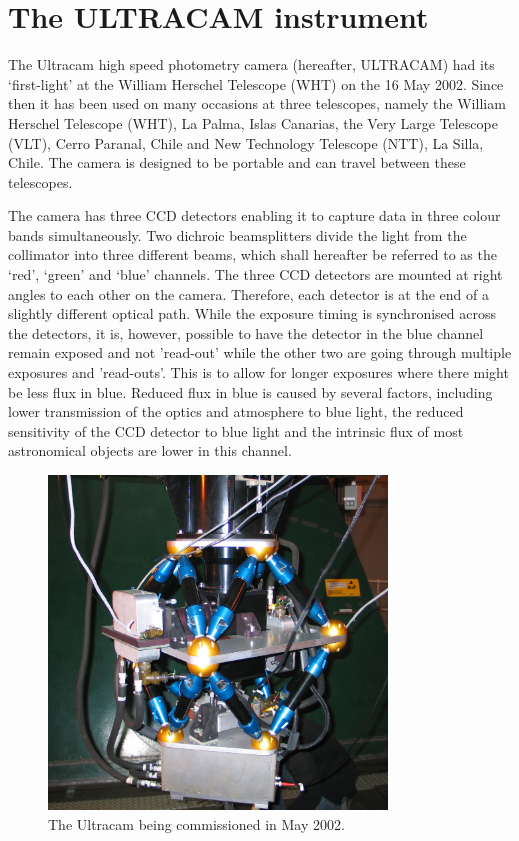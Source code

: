 \section{The ULTRACAM instrument} 

The Ultracam high speed photometry camera (hereafter, ULTRACAM) had its `first-light' at the William Herschel Telescope (WHT) on the 16 May 2002. Since then it has been used on many occasions at three telescopes, namely the William Herschel Telescope (WHT), La Palma, Islas Canarias, the Very Large Telescope (VLT), Cerro Paranal, Chile and New Technology Telescope (NTT), La Silla, Chile. The camera is designed to be portable and can travel between these telescopes. 

The camera has three CCD detectors enabling it to capture data in three colour bands simultaneously. Two dichroic beamsplitters divide the light from the collimator into three different beams, which shall hereafter be referred to as the `red', `green' and `blue' channels. The three CCD detectors are mounted at right angles to each other on the camera. Therefore, each detector is at the end of a slightly different optical path. While the exposure timing is synchronised across the detectors, it is, however, possible to have the detector in the blue channel remain exposed and not 'read-out' while the other two are going through multiple exposures and 'read-outs'. This is to allow for longer exposures where there might be less flux in blue. Reduced flux in blue is caused by several factors, including lower transmission of the optics and atmosphere to blue light, the reduced sensitivity of the CCD detector to blue light and the intrinsic flux of most astronomical objects are lower in this channel.

\begin{figure}[!h]
\centering
\includegraphics[width=90mm]{images/IMG_0121_scaled.JPG}
\caption{The Ultracam being commissioned in May 2002.}
\label{fig1}
\end{figure}

